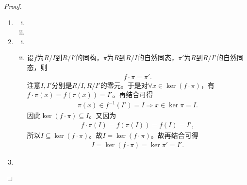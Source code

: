 \documentclass[../../main.tex]{subfiles}%
\begin{document}
\begin{proof}
\begin{enumerate}[(1)]
\item \begin{enumerate}[(i)]
\item 

\item 
\end{enumerate}


\item \begin{enumerate}[(i)]
\item 

\item 设$f$为$R/I$到$R/I'$的同构，$\pi$为$R$到$R/I$的自然同态，$\pi'$为$R$到$R/I'$的自然同态，则
\begin{align*}
f\cdot \pi =\pi'.
\end{align*}
注意$I,I'$分别是$R/I,R/I'$的零元。于是对$\forall x\in \ker\left( f\cdot \pi \right)$，有$f\cdot \pi \left( x \right) =f\left( \pi \left( x \right) \right) =I'$。再结合可得
\begin{align*}
\pi \left( x \right) \in f^{-1}\left( I' \right) =I\Longrightarrow x\in \ker\pi =I.
\end{align*}
因此$\ker\left( f\cdot \pi \right) \subseteq I$。又因为
\begin{align*}
f\cdot \pi \left( I \right) =f\left( \pi \left( I \right) \right) =f\left( I \right) =I',
\end{align*}
所以$I\subseteq \ker\left( f\cdot \pi \right)$。故$I=\ker\left( f\cdot \pi \right)$。故再结合可得
\begin{align*}
I=\ker\left( f\cdot \pi \right) =\ker\pi' =I'.
\end{align*}
\end{enumerate}

\item 
\end{enumerate}
\end{proof}
\end{document}
